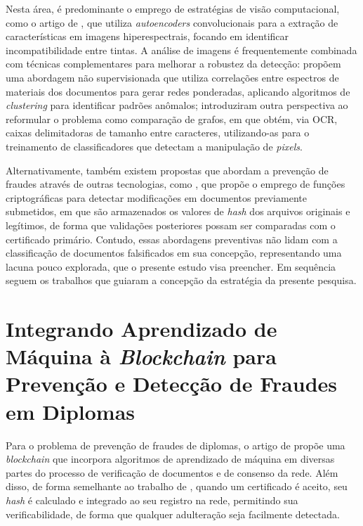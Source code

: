 Nesta área, é predominante o emprego de estratégias de visão computacional, como o artigo de \citeauthor*{inkcnn} \cite*{inkcnn}, que utiliza \textit{autoencoders} convolucionais para a extração de características em imagens hiperespectrais, focando em identificar incompatibilidade entre tintas. A análise de imagens é frequentemente combinada com técnicas complementares para melhorar a robustez da detecção: \citeauthor*{unsupervisednetwork} \cite*{unsupervisednetwork} propõem uma abordagem não supervisionada que utiliza correlações entre espectros de materiais dos documentos para gerar redes ponderadas, aplicando algoritmos de \textit{clustering} para identificar padrões anômalos; \citeauthor*{ocrgraph} \cite*{ocrgraph} introduziram outra perspectiva ao reformular o problema como comparação de grafos, em que obtém, via OCR, caixas delimitadoras de tamanho entre caracteres, utilizando-as para o treinamento de classificadores que detectam a manipulação de \textit{pixels}.

Alternativamente, também existem propostas que abordam a prevenção de fraudes através de outras tecnologias, como \citeauthor*{hashdetection} \cite*{hashdetection}, que propõe o emprego de funções criptográficas para detectar modificações em documentos previamente submetidos, em que são armazenados os valores de \textit{hash} dos arquivos originais e legítimos, de forma que validações posteriores possam ser comparadas com o certificado primário. Contudo, essas abordagens preventivas não lidam com a classificação de documentos falsificados em sua concepção, representando uma lacuna pouco explorada, que o presente estudo visa preencher. Em sequência seguem os trabalhos que guiaram a concepção da estratégia da presente pesquisa.

\section{Integrando Aprendizado de Máquina à \protect\textit{Blockchain} para Prevenção e Detecção de Fraudes em Diplomas}

Para o problema de prevenção de fraudes de diplomas, o artigo de \citeauthor*{blockchainforgery} \cite*{blockchainforgery} propõe uma \textit{blockchain} que incorpora algoritmos de aprendizado de máquina em diversas partes do processo de verificação de documentos e de consenso da rede. Além disso, de forma semelhante ao trabalho de \citeauthor*{hashdetection} \cite*{hashdetection}, quando um certificado é aceito, seu \textit{hash} é calculado e integrado ao seu registro na rede, permitindo sua verificabilidade, de forma que qualquer adulteração seja facilmente detectada.

